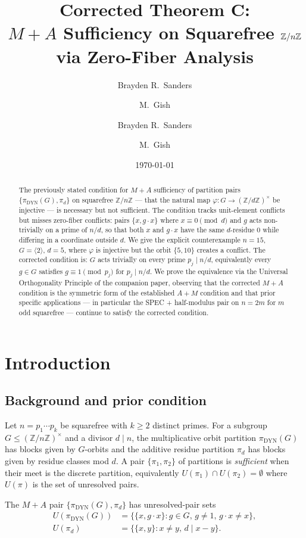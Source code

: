\documentclass[11pt,reqno]{amsart}
\title[Corrected Theorem C]{Corrected Theorem C:\\
$M+A$ Sufficiency on Squarefree $\Z/n\Z$ via Zero-Fiber Analysis}
\author{Brayden R.\ Sanders \and M.\ Gish}
\author{Brayden R.\ Sanders \and M.\ Gish}
\date{\today}
\theoremstyle{plain}
\theoremstyle{definition}
\newcommand{\Z}{\mathbb{Z}}
\newcommand{\Zn}{\Z/n\Z}
\newcommand{\Zns}{(\Z/n\Z)^{\times}}
\newcommand{\DYN}{\mathrm{DYN}}
\begin{document}
\begin{abstract}
The previously stated condition for $M{+}A$ sufficiency of partition pairs $\{\pi_{\DYN}(G), \pi_d\}$ on squarefree $\Zn$ --- that the natural map $\varphi \colon G \to (\Z/d\Z)^{\times}$ be injective --- is necessary but not sufficient. The condition tracks unit-element conflicts but misses zero-fiber conflicts: pairs $\{x, g \cdot x\}$ where $x \equiv 0 \pmod d$ and $g$ acts non-trivially on a prime of $n/d$, so that both $x$ and $g \cdot x$ have the same $d$-residue $0$ while differing in a coordinate outside $d$. We give the explicit counterexample $n = 15$, $G = \langle 2 \rangle$, $d = 5$, where $\varphi$ is injective but the orbit $\{5,10\}$ creates a conflict. The corrected condition is: $G$ acts trivially on every prime $p_j \mid n/d$, equivalently every $g \in G$ satisfies $g \equiv 1 \pmod{p_j}$ for $p_j \mid n/d$. We prove the equivalence via the Universal Orthogonality Principle of the companion paper, observing that the corrected $M{+}A$ condition is the symmetric form of the established $A{+}M$ condition and that prior specific applications --- in particular the SPEC + half-modulus pair on $n = 2m$ for $m$ odd squarefree --- continue to satisfy the corrected condition.
\end{abstract}

\maketitle

\section{Introduction}

\subsection{Background and prior condition}

Let $n = p_1 \cdots p_k$ be squarefree with $k \geq 2$ distinct primes. For a subgroup $G \leq \Zns$ and a divisor $d \mid n$, the multiplicative orbit partition $\pi_{\DYN}(G)$ has blocks given by $G$-orbits and the additive residue partition $\pi_d$ has blocks given by residue classes mod $d$. A pair $\{\pi_1, \pi_2\}$ of partitions is \emph{sufficient} when their meet is the discrete partition, equivalently $U(\pi_1) \cap U(\pi_2) = \emptyset$ where $U(\pi)$ is the set of unresolved pairs.

The $M{+}A$ pair $\{\pi_{\DYN}(G), \pi_d\}$ has unresolved-pair sets
\begin{align*}
U(\pi_{\DYN}(G)) &= \{\{x, g \cdot x\} : g \in G,\, g \neq 1,\, g \cdot x \neq x\},\\
U(\pi_d) &= \{\{x,y\} : x \neq y,\, d \mid x - y\}.
\end{align*}
\end{document}

